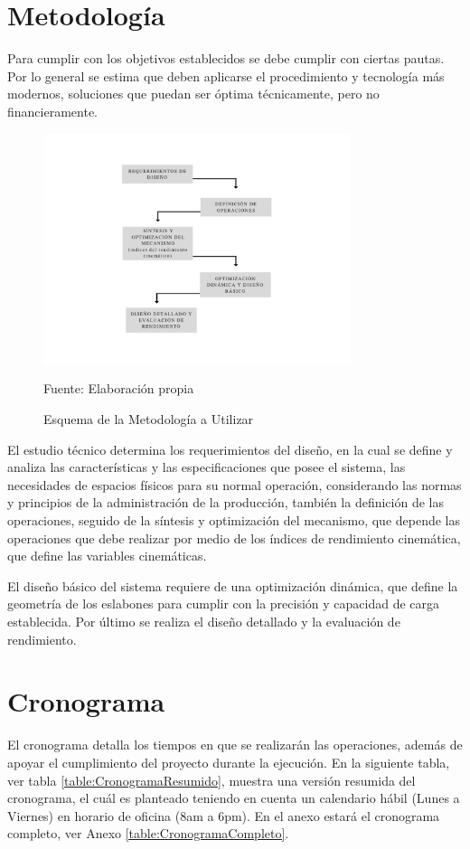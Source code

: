 \section{Metodología}
Para cumplir con los objetivos establecidos se debe cumplir con ciertas pautas. Por lo general se estima que deben aplicarse el procedimiento y tecnología más modernos, soluciones que puedan ser óptima técnicamente, pero no financieramente.

\begin{figure}[htb!]
    \centering
    \includegraphics[width=0.8\textwidth]{Cap1_FormulaciondelProyecto/Figuras/MetodologiaEsquema.pdf}
    \caption{Esquema de la Metodología a Utilizar}{Fuente: Elaboración propia}
    \label{fig:MetodologiaEsquema}
\end{figure}

El estudio técnico determina los requerimientos del diseño, en la cual se define y analiza las características y las especificaciones que posee el sistema, las necesidades de espacios físicos para su normal operación, considerando las normas y principios de la administración de la producción, también la definición de las operaciones, seguido de la síntesis y optimización del mecanismo, que depende las operaciones que debe realizar por medio de los índices de rendimiento cinemática, que define las variables cinemáticas. 

El diseño básico del sistema requiere de una optimización dinámica, que define la geometría de los eslabones para cumplir con la precisión y capacidad de carga establecida. Por último se realiza el diseño detallado y la evaluación de rendimiento.

\section{Cronograma}
El cronograma detalla los tiempos en que se realizarán las operaciones, además de apoyar el cumplimiento del proyecto durante la ejecución. En la siguiente tabla, ver tabla \ref{table:CronogramaResumido}, muestra una versión resumida del cronograma, el cuál es planteado teniendo en cuenta un calendario hábil (Lunes a Viernes) en horario de oficina (8am a 6pm). En el anexo estará el cronograma completo, ver Anexo \ref{table:CronogramaCompleto}.
